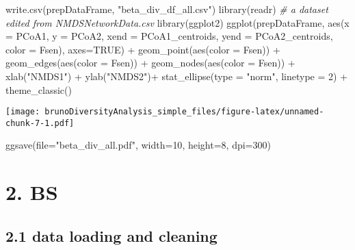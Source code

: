 \documentclass[
]{article}
\newenvironment{Shaded}{\begin{snugshade}}{\end{snugshade}}
\newcommand{\AttributeTok}[1]{\textcolor[rgb]{0.77,0.63,0.00}{#1}}
\newcommand{\CommentTok}[1]{\textcolor[rgb]{0.56,0.35,0.01}{\textit{#1}}}
\newcommand{\ConstantTok}[1]{\textcolor[rgb]{0.00,0.00,0.00}{#1}}
\newcommand{\DecValTok}[1]{\textcolor[rgb]{0.00,0.00,0.81}{#1}}
\newcommand{\FunctionTok}[1]{\textcolor[rgb]{0.00,0.00,0.00}{#1}}
\newcommand{\NormalTok}[1]{#1}
\newcommand{\SpecialCharTok}[1]{\textcolor[rgb]{0.00,0.00,0.00}{#1}}
\newcommand{\StringTok}[1]{\textcolor[rgb]{0.31,0.60,0.02}{#1}}
\begin{document}
\begin{Shaded}
\begin{Highlighting}[]
\FunctionTok{write.csv}\NormalTok{(prepDataFrame, }\StringTok{"beta\_div\_df\_all.csv"}\NormalTok{)}
\FunctionTok{library}\NormalTok{(readr)}
\CommentTok{\# a dataset edited from NMDSNetworkData.csv}
\FunctionTok{library}\NormalTok{(ggplot2)}
\FunctionTok{ggplot}\NormalTok{(prepDataFrame, }\FunctionTok{aes}\NormalTok{(}\AttributeTok{x =}\NormalTok{ PCoA1, }\AttributeTok{y =}\NormalTok{ PCoA2, }\AttributeTok{xend =}\NormalTok{ PCoA1\_centroids, }\AttributeTok{yend =}\NormalTok{ PCoA2\_centroids, }\AttributeTok{color =}\NormalTok{ Fsen), }\AttributeTok{axes=}\ConstantTok{TRUE}\NormalTok{) }\SpecialCharTok{+}
  \FunctionTok{geom\_point}\NormalTok{(}\FunctionTok{aes}\NormalTok{(}\AttributeTok{color =}\NormalTok{ Fsen)) }\SpecialCharTok{+}
  \FunctionTok{geom\_edges}\NormalTok{(}\FunctionTok{aes}\NormalTok{(}\AttributeTok{color =}\NormalTok{ Fsen)) }\SpecialCharTok{+}
  \FunctionTok{geom\_nodes}\NormalTok{(}\FunctionTok{aes}\NormalTok{(}\AttributeTok{color =}\NormalTok{ Fsen)) }\SpecialCharTok{+}
  \FunctionTok{xlab}\NormalTok{(}\StringTok{"NMDS1"}\NormalTok{) }\SpecialCharTok{+}
  \FunctionTok{ylab}\NormalTok{(}\StringTok{"NMDS2"}\NormalTok{)}\SpecialCharTok{+}
  \FunctionTok{stat\_ellipse}\NormalTok{(}\AttributeTok{type =} \StringTok{"norm"}\NormalTok{, }\AttributeTok{linetype =} \DecValTok{2}\NormalTok{) }\SpecialCharTok{+}
  \FunctionTok{theme\_classic}\NormalTok{()}
\end{Highlighting}
\end{Shaded}

\texttt{[image: brunoDiversityAnalysis\_simple\_files/figure-latex/unnamed-chunk-7-1.pdf]}

\begin{Shaded}
\begin{Highlighting}[]
\FunctionTok{ggsave}\NormalTok{(}\AttributeTok{file=}\StringTok{"beta\_div\_all.pdf"}\NormalTok{, }\AttributeTok{width=}\DecValTok{10}\NormalTok{, }\AttributeTok{height=}\DecValTok{8}\NormalTok{, }\AttributeTok{dpi=}\DecValTok{300}\NormalTok{)}
\end{Highlighting}
\end{Shaded}

\hypertarget{bs}{%
\section{2. BS}\label{bs}}

\hypertarget{data-loading-and-cleaning-1}{%
\subsection{2.1 data loading and
cleaning}\label{data-loading-and-cleaning-1}}
\end{document}

